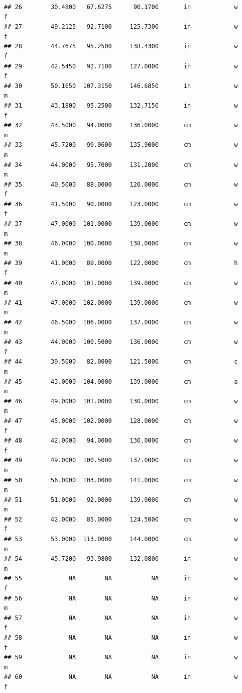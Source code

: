 \documentclass[]{article}
\begin{document}
\begin{verbatim}
## 26        30.4800   67.6275      90.1700       in            w         f
## 27        49.2125   92.7100     125.7300       in            w         f
## 28        44.7675   95.2500     138.4300       in            w         f
## 29        42.5450   92.7100     127.0000       in            w         f
## 30        50.1650  107.3150     146.6850       in            w         m
## 31        43.1800   95.2500     132.7150       in            w         f
## 32        43.5000   94.0000     136.0000       cm            w         m
## 33        45.7200   99.0600     135.9000       cm            w         m
## 34        44.0000   95.7000     131.2000       cm            w         m
## 35        40.5000   88.0000     120.0000       cm            w         f
## 36        41.5000   90.0000     123.0000       cm            w         f
## 37        47.0000  101.0000     139.0000       cm            w         m
## 38        46.0000  100.0000     138.0000       cm            w         m
## 39        41.0000   89.0000     122.0000       cm            h         f
## 40        47.0000  101.0000     139.0000       cm            w         m
## 41        47.0000  102.0000     139.0000       cm            w         m
## 42        46.5000  106.0000     137.0000       cm            w         m
## 43        44.0000  100.5000     136.0000       cm            w         f
## 44        39.5000   82.0000     121.5000       cm            c         m
## 45        43.0000  104.0000     139.0000       cm            a         m
## 46        49.0000  101.0000     130.0000       cm            w         m
## 47        45.0000  102.0000     128.0000       cm            w         f
## 48        42.0000   94.0000     130.0000       cm            w         f
## 49        49.0000  100.5000     137.0000       cm            w         m
## 50        56.0000  103.0000     141.0000       cm            w         m
## 51        51.0000   92.0000     139.0000       cm            w         m
## 52        42.0000   85.0000     124.5000       cm            w         f
## 53        53.0000  113.0000     144.0000       cm            w         m
## 54        45.7200   93.9800     132.0800       in            w         m
## 55             NA        NA           NA       in            w         f
## 56             NA        NA           NA       in            w         m
## 57             NA        NA           NA       in            w         f
## 58             NA        NA           NA       in            w         f
## 59             NA        NA           NA       in            w         m
## 60             NA        NA           NA       in            w         f

\end{verbatim}
\end{document}
